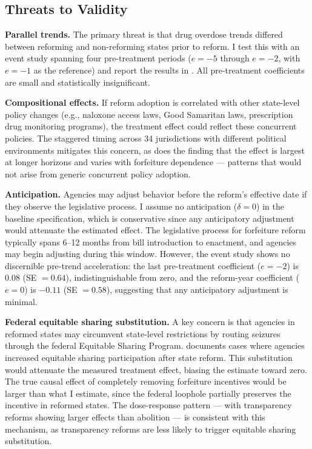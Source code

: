 \documentclass[12pt]{article}
\begin{document}
\subsection{Threats to Validity}

\textbf{Parallel trends.} The primary threat is that drug overdose trends differed between reforming and non-reforming states prior to reform. I test this with an event study spanning four pre-treatment periods ($e = -5$ through $e = -2$, with $e = -1$ as the reference) and report the results in . All pre-treatment coefficients are small and statistically insignificant.

\textbf{Compositional effects.} If reform adoption is correlated with other state-level policy changes (e.g., naloxone access laws, Good Samaritan laws, prescription drug monitoring programs), the treatment effect could reflect these concurrent policies. The staggered timing across 34 jurisdictions with different political environments mitigates this concern, as does the finding that the effect is largest at longer horizons and varies with forfeiture dependence --- patterns that would not arise from generic concurrent policy adoption.

\textbf{Anticipation.} Agencies may adjust behavior before the reform's effective date if they observe the legislative process. I assume no anticipation ($\delta = 0$) in the baseline specification, which is conservative since any anticipatory adjustment would attenuate the estimated effect. The legislative process for forfeiture reform typically spans 6--12 months from bill introduction to enactment, and agencies may begin adjusting during this window. However, the event study shows no discernible pre-trend acceleration: the last pre-treatment coefficient ($e = -2$) is $0.08$ (SE $= 0.64$), indistinguishable from zero, and the reform-year coefficient ($e = 0$) is $-0.11$ (SE $= 0.58$), suggesting that any anticipatory adjustment is minimal.

\textbf{Federal equitable sharing substitution.} A key concern is that agencies in reformed states may circumvent state-level restrictions by routing seizures through the federal Equitable Sharing Program. \citet{carpenter2020policing} documents cases where agencies increased equitable sharing participation after state reform. This substitution would attenuate the measured treatment effect, biasing the estimate toward zero. The true causal effect of completely removing forfeiture incentives would be larger than what I estimate, since the federal loophole partially preserves the incentive in reformed states. The dose-response pattern --- with transparency reforms showing larger effects than abolition --- is consistent with this mechanism, as transparency reforms are less likely to trigger equitable sharing substitution.
\end{document}
